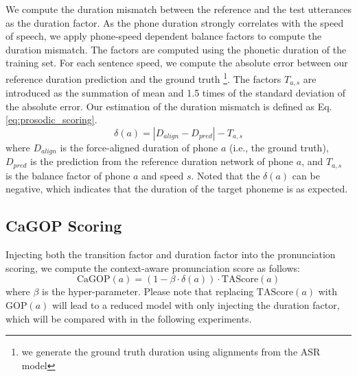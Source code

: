 \documentclass[a4paper]{article}
\begin{document}
We compute the duration mismatch between the reference and the test utterances as the duration factor. As the phone duration strongly correlates with the speed of speech, we apply phone-speed dependent balance factors to compute the duration mismatch. The factors are computed using the phonetic duration of the training set. For each sentence speed, we compute the absolute error between our reference duration prediction and the ground truth \footnote{we generate the ground truth duration using alignments from the ASR model}. The factors $T_{a, s}$ are introduced as the summation of mean and 1.5 times of the standard deviation of the absolute error. Our estimation of the duration mismatch is defined as Eq. \eqref{eq:prosodic_scoring}.
\begin{equation}
    \label{eq:prosodic_scoring}
    \delta (a) = |D_{align} - D_{pred}| - T_{a, s}
\end{equation}
where $D_{align}$ is the force-aligned duration of phone $a$ (i.e., the ground truth), $D_{pred}$ is the prediction from the reference duration network of phone $a$, and $T_{a, s}$ is the balance factor of phone $a$ and speed $s$. Noted that the $\delta(a)$ can be negative, which indicates that the duration of the target phoneme is as expected.

\vspace{-4pt}
\subsection{CaGOP Scoring}
Injecting both the transition factor and duration factor into the pronunciation scoring, we compute the context-aware pronunciation score as follows:
\begin{equation}
    \label{eq:CaGOP-compute}
    \text{CaGOP}(a) = (1 - \beta \cdot \delta(a)) \cdot \text{TAScore}(a)
\end{equation}
where $\beta$ is the hyper-parameter. Please note that replacing $\text{TAScore}(a)$ with $\text{GOP}(a)$ will lead to a reduced model with only injecting the duration factor, which will be compared with in the following experiments. 
\end{document}
